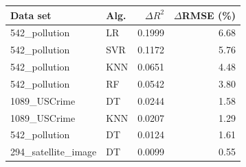 \begin{tabular}{llrr}
\toprule
\textbf{Data set} & \textbf{Alg.} & \textbf{$\Delta R^2$} & \textbf{$\Delta$RMSE (\%)} \\
\midrule
542\_pollution & LR & 0.1999 & 6.68 \\
542\_pollution & SVR & 0.1172 & 5.76 \\
542\_pollution & KNN & 0.0651 & 4.48 \\
542\_pollution & RF & 0.0542 & 3.80 \\
1089\_USCrime & DT & 0.0244 & 1.58 \\
1089\_USCrime & KNN & 0.0207 & 1.29 \\
542\_pollution & DT & 0.0124 & 1.61 \\
294\_satellite\_image & DT & 0.0099 & 0.55 \\
\bottomrule
\end{tabular}
